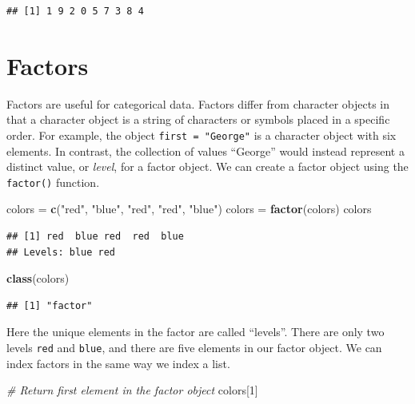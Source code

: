 \documentclass[
]{book}
\newenvironment{Shaded}{\begin{snugshade}}{\end{snugshade}}
\newcommand{\CommentTok}[1]{\textcolor[rgb]{0.56,0.35,0.01}{\textit{#1}}}
\newcommand{\DecValTok}[1]{\textcolor[rgb]{0.00,0.00,0.81}{#1}}
\newcommand{\KeywordTok}[1]{\textcolor[rgb]{0.13,0.29,0.53}{\textbf{#1}}}
\newcommand{\NormalTok}[1]{#1}
\newcommand{\StringTok}[1]{\textcolor[rgb]{0.31,0.60,0.02}{#1}}
\begin{document}
\begin{verbatim}
## [1] 1 9 2 0 5 7 3 8 4
\end{verbatim}

\hypertarget{factors}{%
\section{Factors}\label{factors}}

Factors are useful for categorical data. Factors differ from character objects in that a character object is a string of characters or symbols placed in a specific order. For example, the object \texttt{first\ =\ "George"} is a character object with six elements. In contrast, the collection of values ``George'' would instead represent a distinct value, or \emph{level}, for a factor object. We can create a factor object using the \texttt{factor()} function.

\begin{Shaded}
\begin{Highlighting}[]
\NormalTok{colors =}\StringTok{ }\KeywordTok{c}\NormalTok{(}\StringTok{"red"}\NormalTok{, }\StringTok{"blue"}\NormalTok{, }\StringTok{"red"}\NormalTok{, }\StringTok{"red"}\NormalTok{, }\StringTok{"blue"}\NormalTok{)}
\NormalTok{colors =}\StringTok{ }\KeywordTok{factor}\NormalTok{(colors)}
\NormalTok{colors}
\end{Highlighting}
\end{Shaded}

\begin{verbatim}
## [1] red  blue red  red  blue
## Levels: blue red
\end{verbatim}

\begin{Shaded}
\begin{Highlighting}[]
\KeywordTok{class}\NormalTok{(colors)}
\end{Highlighting}
\end{Shaded}

\begin{verbatim}
## [1] "factor"
\end{verbatim}

Here the unique elements in the factor are called ``levels''. There are only two levels \texttt{red} and \texttt{blue}, and there are five elements in our factor object. We can index factors in the same way we index a list.

\begin{Shaded}
\begin{Highlighting}[]
\CommentTok{# Return first element in the factor object }
\NormalTok{colors[}\DecValTok{1}\NormalTok{]}
\end{Highlighting}
\end{Shaded}
\end{document}
